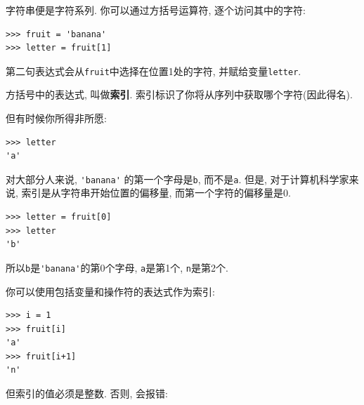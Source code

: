 \documentclass[10pt]{book}
\begin{document}
字符串便是字符系列. 
你可以通过方括号运算符, 逐个访问其中的字符:

\begin{verbatim}
>>> fruit = 'banana'
>>> letter = fruit[1]
\end{verbatim}
%
第二句表达式会从{\tt fruit}中选择在位置1处的字符, 并赋给变量{\tt letter}. 

方括号中的表达式, 叫做{\bf 索引}.
索引标识了你将从序列中获取哪个字符(因此得名).

但有时候你所得非所愿:

\begin{verbatim}
>>> letter
'a'
\end{verbatim}
%
对大部分人来说, \verb"'banana'" 的第一个字母是{\tt b}, 
而不是{\tt a}. 但是, 对于计算机科学家来说, 索引是从字符串开始位置的偏移量, 
而第一个字符的偏移量是0.

\begin{verbatim}
>>> letter = fruit[0]
>>> letter
'b'
\end{verbatim}
%
所以{\tt b}是\verb"'banana'"的第0个字母, {\tt a}是第1个, {\tt n}是第2个. 

你可以使用包括变量和操作符的表达式作为索引:

\begin{verbatim}
>>> i = 1
>>> fruit[i]
'a'
>>> fruit[i+1]
'n'
\end{verbatim}
%
但索引的值必须是整数. 否则, 会报错:
\end{document}
